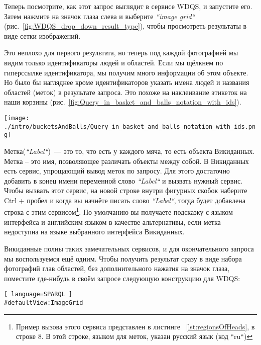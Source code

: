 \newpage Теперь посмотрите, как этот запрос выглядит в сервисе WDQS, и запустите его. Затем нажмите на значок глаза слева и выберите \textit{``image grid``} (рис.~\ref{fig:WDQS_drop_down_result_type}), чтобы просмотреть результаты в виде сетки изображений.

\begin{marginfigure}
	{
		\setlength{\fboxsep}{0pt}%
		\setlength{\fboxrule}{1pt}%
	}
    \caption{Выбор отображения результатов в виде \textit{``image grid``} (сетки изображений).}
	\label{fig:WDQS_drop_down_result_type}
\end{marginfigure}

Это неплохо для первого результата, но теперь под каждой фотографией мы видим только идентификаторы людей и областей. Если мы щёлкнем по гиперссылке идентификатора, мы получим много информации об этом объекте. Но было бы нагляднее кроме идентификаторов указать имена людей и названия областей (меток) в результате запроса. Это похоже на наклеивание этикеток на наши корзины (рис.~\ref{fig:Query_in_basket_and_balls_notation_with_ids}).

\begin{figure*}[h!]
\texttt{[image: ./intro/bucketsAndBalls/Query\_in\_basket\_and\_balls\_notation\_with\_ids.png]}
\caption{Запрос в нотации <<Корзины и мячи>> с номерами свойств и объектов Викиданных.}
\label{fig:Query_in_basket_and_balls_notation_with_ids}
\end{figure*}

Метка(\textit{``Label``})~--- это то, что есть у каждого мяча, то есть объекта Викиданных. Метка – это имя, позволяющее различать объекты между собой. В Викиданных есть сервис, упрощающий вывод меток по запросу. Для этого достаточно добавить в конец имени переменной слово \textit{``Label``} и вызвать нужный сервис. Чтобы вызвать этот сервис, на новой строке внутри фигурных скобок наберите Ctrl + пробел и когда вы начнёте писать слово \textit{``Label``}, тогда будет добавлена строка с этим сервисом\footnote[][12pt]{Пример вызова этого сервиса представлен в листинге ~\ref{lst:regionsOfHeads}, в строке 8. В этой строке, языком для меток, указан русский язык (код ``ru``)}. По умолчанию вы получаете подсказку с языком интерфейса и английским языком в качестве альтернативы, если метка недоступна на языке выбранного интерфейса Викиданных.

Викиданные полны таких замечательных сервисов, и для окончательного запроса мы воспользуемся ещё одним. Чтобы получить результат сразу в виде набора фотографий глав областей, без дополнительного нажатия на значок глаза, поместите где-нибудь в своём запросе следующую конструкцию для WDQS:
\begin{lstlisting}[ language=SPARQL ]
#defaultView:ImageGrid
\end{lstlisting}

